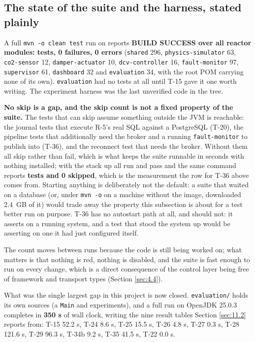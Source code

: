\subsection{The state of the suite and the harness, stated plainly}\label{sec:K.2}

A full \texttt{mvn -o clean test} run on \factSuiteRunDate{} reports \textbf{BUILD SUCCESS over all
\factReactorModules{} reactor modules: \factSuiteTests{} tests, 0 failures, 0 errors}
(\texttt{shared} 296, \texttt{physics-simulator} 63, \texttt{co2-sensor} 12, \texttt{damper-actuator}
10, \texttt{dcv-controller} 16, \texttt{fault-monitor} 97, \texttt{supervisor} 61,
\texttt{dashboard} 32 and \texttt{evaluation} 34, with the root POM carrying none of its own).
\texttt{evaluation} had no tests at all until T-15 gave it one worth writing. The experiment
harness was the last unverified code in the tree.

\textbf{No skip is a gap, and the skip count is not a fixed property of the suite.} The
\factGuardedTests{} tests that can skip assume something outside the JVM is reachable: the
\factJournalTests{} journal tests that execute R-5's real SQL against a PostgreSQL (T-20), the
\factPipelineTests{} pipeline tests that additionally need the broker and a running \texttt{fault-monitor} to publish
into (T-36), and the \factReconnectTests{} reconnect test that needs the broker. Without them all
\factGuardedTests{} skip rather than fail, which is what keeps the suite runnable in seconds with
nothing installed; with the stack up all \factGuardedTests{} run and pass and the same command
reports \textbf{\factSuiteTests{} tests and 0 skipped}, which is the measurement the row for T-36
above comes from. Starting anything is deliberately not the default: a suite that waited on a database
(or, under \texttt{mvn -o} on a machine without the image, downloaded 2.4~GB of it) would trade
away the property this subsection is about for a test better run on purpose. T-36 has no autostart
path at all, and should not: it asserts on a running system, and a test that stood the system up
would be asserting on one it had just configured itself.

The count moves between runs because the code is still being worked on; what
matters is that nothing is red, nothing is disabled, and the suite is fast enough to run on every
change, which is a direct consequence of the control layer being free of framework and transport
types (Section \ref{sec:4.4}).

What was the single largest gap in this project is now closed. \texttt{evaluation/} holds its own
sources (a \texttt{Main} and \textbf{\factExperiments{}} experiments), and a full run on OpenJDK 25.0.3 completes
in \textbf{350 s} of wall clock, writing the nine result tables Section \ref{sec:11.2} reports from:
T-15 52.2 s, T-24 8.6 s, T-25 15.5 s, T-26 4.8 s, T-27 0.3 s, T-28 121.6 s, T-29 96.3 s,
T-34b 9.2 s, T-35 41.5 s, T-22 0.0 s.

